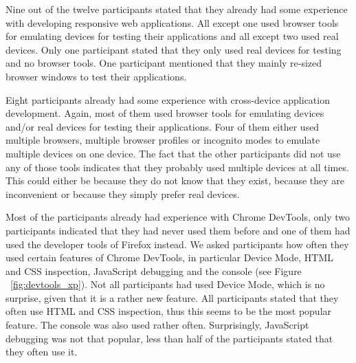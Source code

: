 Nine out of the twelve participants stated that they already had some experience with developing responsive web applications. All except one used browser tools for emulating devices for testing their applications and all except two used real devices. Only one participant stated that they only used real devices for testing and no browser tools. One participant mentioned that they mainly re-sized browser windows to test their applications.

Eight participants already had some experience with cross-device application development. Again, most of them used browser tools for emulating devices and/or real devices for testing their applications. Four of them either used multiple browsers, multiple browser profiles or incognito modes to emulate multiple devices on one device. The fact that the other participants did not use any of those tools indicates that they probably used multiple devices at all times. This could either be because they do not know that they exist, because they are inconvenient or because they simply prefer real devices.

Most of the participants already had experience with Chrome DevTools, only two participants indicated that they had never used them before and one of them had used the developer tools of Firefox instead. We asked participants how often they used certain features of Chrome DevTools, in particular Device Mode, HTML and CSS inspection, JavaScript debugging and the console (see Figure ~\ref{fig:devtools_xp}). Not all participants had used Device Mode, which is no surprise, given that it is a rather new feature. All participants stated that they often use HTML and CSS inspection, thus this seems to be the most popular feature. The console was also used rather often. Surprisingly, JavaScript debugging was not that popular, less than half of the participants stated that they often use it.


